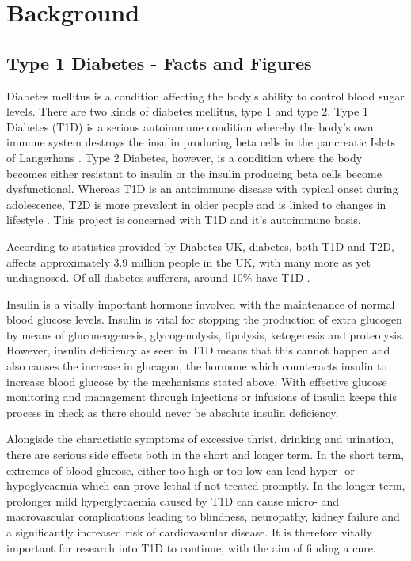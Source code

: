 
\chapter{Background}


\section{Type 1 Diabetes - Facts and Figures}
\label{sec:sectionLabel}


Diabetes mellitus is a condition affecting the body's ability to control blood sugar levels.
There are two kinds of diabetes mellitus, type 1 and type 2.
Type 1 Diabetes (T1D) is a serious autoimmune condition whereby the body's own immune system destroys the insulin producing beta cells in the pancreatic Islets of Langerhans \citep{Daneman2006}.
Type 2 Diabetes, however, is a condition where the body becomes either resistant to insulin or the insulin producing beta cells become dysfunctional.
Whereas T1D is an antoimmune disease with typical onset during adolescence, T2D is more prevalent in older people and is linked to changes in lifestyle \citep{OxClinMed}.
This project is concerned with T1D and it's autoimmune basis.

According to statistics provided by Diabetes UK, diabetes, both T1D and T2D, affects approximately 3.9 million people in the UK, with many more as yet undiagnosed. 
Of all diabetes sufferers, around 10\% have T1D .

Insulin is a vitally important hormone involved with the maintenance of normal blood glucose levels.
Insulin is vital for stopping the production of extra glucogen by means of gluconeogenesis, glycogenolysis, lipolysis, ketogenesis and proteolysis.
However, insulin deficiency as seen in T1D means that this cannot happen and also causes the increase in glucagon, the hormone which counteracts insulin to increase blood glucose by the mechanisms stated above\citep{Sonksen2000}.
With effective glucose monitoring and management through injections or infusions of insulin keeps this process in check as there should never be absolute insulin deficiency.

Alongisde the charactistic symptoms of excessive thrist, drinking and urination, there are serious side effects both in the short and longer term.
In the short term, extremes of blood glucose, either too high or too low can lead hyper- or hypoglycaemia which can prove lethal if not treated promptly.
In the longer term, prolonger mild hyperglycaemia caused by T1D can cause micro- and macrovascular complications leading to blindness, neuropathy, kidney failure and a significantly increased risk of cardiovascular disease\citep{OxClinMed}.
It is therefore vitally important for research into T1D to continue, with the aim of finding a cure.

